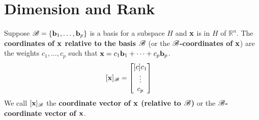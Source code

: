 \newpage

\section{Dimension and Rank}
\name

\begin{boxdef}
	Suppose $\B=\vectset[b]{1}{p}$ is a basis for a subspace $H$ and $\vect{x}$ is in $H$ of $\mathbb{R}^n$. The \textbf{coordinates of $\boldsymbol{\vect{x}}$ relative to the basis $\boldsymbol{\B}$} (or the $\boldsymbol{\B}$\textbf{-coordinates of} $\boldsymbol{\vect{x}}$) are the weights $c_1,\ldots,c_p$ such that $\vect{x} = c_1\vect{b}_1 + \cdots + c_p\vect{b}_p$.
	\begin{align*}
	\vectB &= \begin{bmatrix}[c]c_1 \\ \vdots \\ c_p\end{bmatrix}
	\end{align*}
	We call $\vectB$ the \textbf{coordinate vector of $\boldsymbol{\vect{x}}$ (relative to $\boldsymbol{\B}$)} or the \textbf{$\boldsymbol{\B}$-coordinate vector of $\boldsymbol{\vect{x}}$}.
\end{boxdef}


